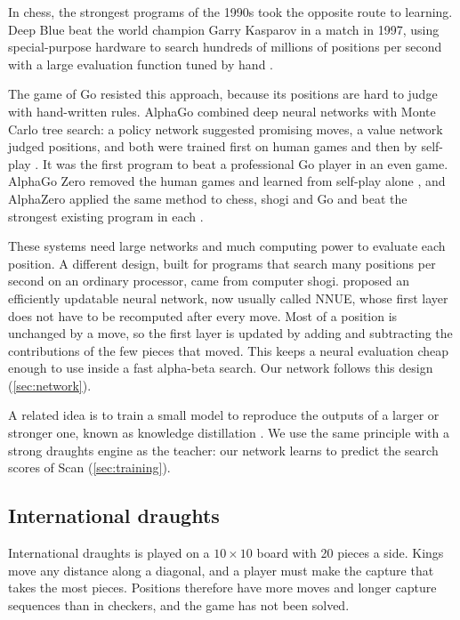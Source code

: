In chess, the strongest programs of the 1990s took the opposite route to
learning. Deep Blue beat the world champion Garry Kasparov in a match in 1997,
using special-purpose hardware to search hundreds of millions of positions per
second with a large evaluation function tuned by hand
\parencite{campbell2002}.

The game of Go resisted this approach, because its positions are hard to judge
with hand-written rules. AlphaGo combined deep neural networks with Monte Carlo
tree search: a policy network suggested promising moves, a value network judged
positions, and both were trained first on human games and then by self-play
\parencite{silver2016}. It was the first program to beat a professional Go
player in an even game. AlphaGo Zero removed the human games and learned from
self-play alone \parencite{silver2017}, and AlphaZero applied the same method to
chess, shogi and Go and beat the strongest existing program in each
\parencite{silver2018}.

These systems need large networks and much computing power to evaluate each
position. A different design, built for programs that search many positions per
second on an ordinary processor, came from computer shogi. \textcite{nasu2018}
proposed an efficiently updatable neural network, now usually called NNUE, whose
first layer does not have to be recomputed after every move. Most of a position
is unchanged by a move, so the first layer is updated by adding and subtracting
the contributions of the few pieces that moved. This keeps a neural evaluation
cheap enough to use inside a fast alpha-beta search. Our network follows this
design (\cref{sec:network}).

A related idea is to train a small model to reproduce the outputs of a larger or
stronger one, known as knowledge distillation \parencite{hinton2015}. We use the
same principle with a strong draughts engine as the teacher: our network learns
to predict the search scores of Scan (\cref{sec:training}).

\subsection{International draughts}\label{sec:lit-international}

International draughts is played on a $10\times10$ board with 20 pieces a side.
Kings move any distance along a diagonal, and a player must make the capture that
takes the most pieces. Positions therefore have more moves and longer capture
sequences than in checkers, and the game has not been solved.


